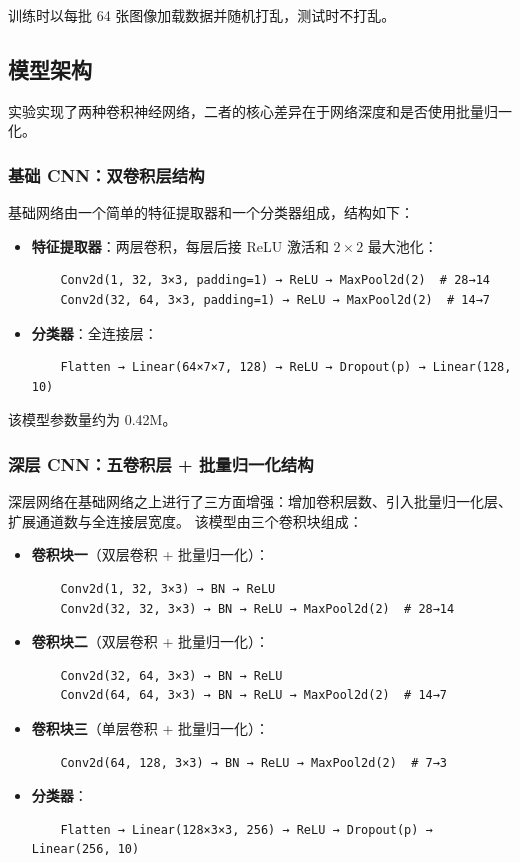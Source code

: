 \documentclass[UTF8,a4paper,12pt]{ctexart}
\begin{document}
训练时以每批 64 张图像加载数据并随机打乱，测试时不打乱。

\subsection{模型架构}

实验实现了两种卷积神经网络，二者的核心差异在于网络深度和是否使用批量归一化。

\subsubsection{基础 CNN：双卷积层结构}

基础网络由一个简单的特征提取器和一个分类器组成，结构如下：

\begin{itemize}
    \item \textbf{特征提取器}：两层卷积，每层后接 ReLU 激活和 $2\times2$ 最大池化：
    \begin{verbatim}
    Conv2d(1, 32, 3×3, padding=1) → ReLU → MaxPool2d(2)  # 28→14
    Conv2d(32, 64, 3×3, padding=1) → ReLU → MaxPool2d(2)  # 14→7
    \end{verbatim}
    \item \textbf{分类器}：全连接层：
    \begin{verbatim}
    Flatten → Linear(64×7×7, 128) → ReLU → Dropout(p) → Linear(128, 10)
    \end{verbatim}
\end{itemize}

该模型参数量约为 0.42M。

\subsubsection{深层 CNN：五卷积层 + 批量归一化结构}

深层网络在基础网络之上进行了三方面增强：增加卷积层数、引入批量归一化层、扩展通道数与全连接层宽度。
该模型由三个卷积块组成：

\begin{itemize}
    \item \textbf{卷积块一}（双层卷积 + 批量归一化）：
    \begin{verbatim}
    Conv2d(1, 32, 3×3) → BN → ReLU
    Conv2d(32, 32, 3×3) → BN → ReLU → MaxPool2d(2)  # 28→14
    \end{verbatim}
    \item \textbf{卷积块二}（双层卷积 + 批量归一化）：
    \begin{verbatim}
    Conv2d(32, 64, 3×3) → BN → ReLU
    Conv2d(64, 64, 3×3) → BN → ReLU → MaxPool2d(2)  # 14→7
    \end{verbatim}
    \item \textbf{卷积块三}（单层卷积 + 批量归一化）：
    \begin{verbatim}
    Conv2d(64, 128, 3×3) → BN → ReLU → MaxPool2d(2)  # 7→3
    \end{verbatim}
    \item \textbf{分类器}：
    \begin{verbatim}
    Flatten → Linear(128×3×3, 256) → ReLU → Dropout(p) → Linear(256, 10)
    \end{verbatim}
\end{itemize}
\end{document}
